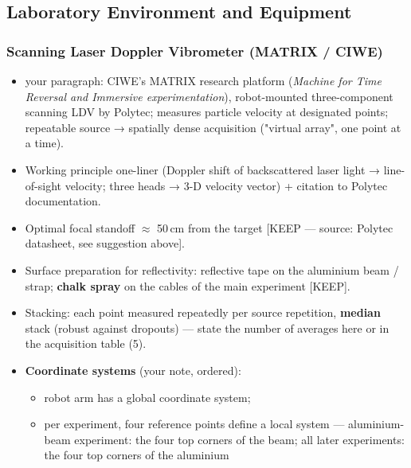 \subsection{Laboratory Environment and Equipment}
\label{sec:methods:equipment}

\subsubsection{Scanning Laser Doppler Vibrometer (MATRIX / CIWE)}
\begin{itemize}
  \item [KEEP] your paragraph: CIWE's MATRIX research platform
    (\textit{Machine for Time Reversal and Immersive experimentation}),
    robot-mounted three-component scanning LDV by Polytec; measures particle
    velocity at designated points; repeatable source → spatially dense
    acquisition ("virtual array", one point at a time).
  \item Working principle one-liner (Doppler shift of backscattered laser
    light → line-of-sight velocity; three heads → 3-D velocity vector) +
    citation to Polytec documentation.
  \item Optimal focal standoff $\approx$ 50\,cm from the target [KEEP —
    source: Polytec datasheet, see suggestion above].
  \item Surface preparation for reflectivity: reflective tape on the
    aluminium beam / strap; \textbf{chalk spray} on the cables of the main
    experiment [KEEP].
  \item Stacking: each point measured repeatedly per source repetition,
    \textbf{median} stack (robust against dropouts) — state the number of
    averages here or in the acquisition table (5).
  \item \textbf{Coordinate systems} (your note, ordered):
    \begin{itemize}
      \item robot arm has a global coordinate system;
      \item per experiment, four reference points define a local system —
        aluminium-beam experiment: the four top corners of the beam;
        all later experiments: the four top corners of the aluminium

\end{itemize}
\end{itemize}
